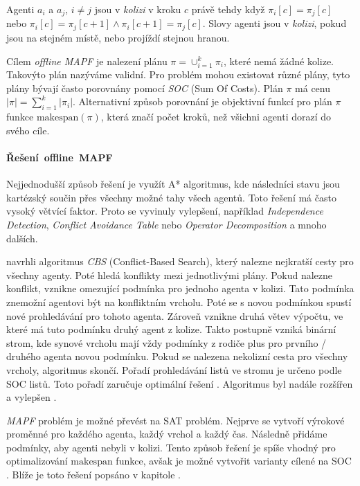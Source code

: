 Agenti $a_i$ a $a_j$, $i \neq j$ jsou v \emph{kolizi} v kroku $c$ právě tehdy když $\pi_i[c] = \pi_j[c]$ nebo
$\pi_i[c] = \pi_j[c + 1] \land \pi_i[c + 1] = \pi_j[c]$.
Slovy agenti jsou v \emph{kolizi}, pokud jsou na stejném místě, nebo projíždí stejnou hranou.

Cílem \emph{offline MAPF} je nalezení plánu $\pi = \cup_{i=1}^{k} \pi_i$, které nemá žádné kolize.
Takovýto plán nazýváme validní.
Pro problém mohou existovat různé plány, tyto plány bývají často porovnány pomocí \emph{SOC} (Sum Of Costs).
Plán $\pi$ má cenu $|\pi| = \sum_{i=1}^{k} |\pi_i|$.
Alternativní způsob porovnání je objektivní funkcí pro plán $\pi$ funkce $\textrm{makespan}(\pi)$,
která značí počet kroků, než všichni agenti dorazí do svého cíle.

\paragraph{Řešení~offline~MAPF}

Nejjednodušší způsob řešení je využít A* algoritmus, kde následníci stavu jsou kartézský součin přes všechny možné tahy všech agentů.
Toto řešení má často vysoký větvící faktor.
Proto se vyvinuly vylepšení, například \emph{Independence Detection}, \emph{Conflict Avoidance Table} nebo \emph{Operator Decomposition} \citep{Standley_2010} a mnoho dalších.

\citet*{Sharon} navrhli algoritmus \emph{CBS} (Conflict-Based Search), který nalezne nejkratší cesty pro všechny agenty.
Poté hledá konflikty mezi jednotlivými plány.
Pokud nalezne konflikt, vznikne omezující podmínka pro jednoho agenta v kolizi.
Tato podmínka znemožní agentovi být na konfliktním vrcholu.
Poté se s novou podmínkou spustí nové prohledávání pro tohoto agenta.
Zároveň vznikne druhá větev výpočtu, ve které má tuto podmínku druhý agent z kolize.
Takto postupně vzniká binární strom, kde synové vrcholu mají vždy podmínky z rodiče plus pro prvního / druhého agenta novou podmínku.
Pokud se nalezena nekolizní cesta pro všechny vrcholy, algoritmus skončí.
Pořadí prohledávání listů ve stromu je určeno podle SOC listů.
Toto pořadí zaručuje optimální řešení \citep{Sharon}.
Algoritmus byl nadále rozšířen a vylepšen \citep{Boyarski}.

\emph{MAPF} problém je možné převést na SAT problém.
Nejprve se vytvoří výrokové proměnné pro každého agenta, každý vrchol a každý čas.
Následně přidáme podmínky, aby agenti nebyli v kolizi.
Tento způsob řešení je spíše vhodný pro optimalizování $\textrm{makespan}$ funkce,
avšak je možné vytvořit varianty cílené na SOC \citep{bartak}.
Blíže je toto řešení popsáno v kapitole .


